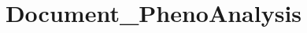 \documentclass[11pt]{book}
\begin{document}









\title{Document_PhenoAnalysis} %
\end{document}
